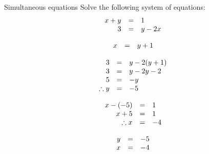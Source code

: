 \begin{wex}
{Simultaneous equations }
{
Solve the following system of equations:
\begin{equation*}
\begin{array}{ccl}\hfill x+y& =& 1\hfill \\ \hfill 3& =& y-2x\hfill \end{array}
\end{equation*}
}
{
\begin{equation*}
    \begin{array}{ccl}\hfill x& =& y+1\hfill 
    \end{array}
\end{equation*}

\begin{equation*}
    \begin{array}{ccl}\hfill 3& =& y-2(y+1)\hfill \\
	\hfill 3& =& y - 2y - 2\hfill \\
	\hfill 5& =& -y\hfill \\
\hfill \therefore y& =& -5\hfill
    \end{array}
\end{equation*}

\begin{equation*}
    \begin{array}{ccl}\hfill x - (-5)& =& 1\hfill \\
	\hfill x+ 5& =& 1\hfill \\
\hfill \therefore x& =& -4\hfill
    \end{array}
\end{equation*}


\begin{equation*}
\begin{array}{ccl}\hfill y& =& -5\hfill \\
 \hfill x& =& -4\hfill 
\end{array}
\end{equation*}
}
\end{wex}

